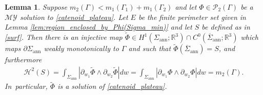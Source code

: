 \documentclass[JEP,XML,SOM,Unicode, NoFloatCountersInSection,published]{cedram}
\newcommand{\R}{\mathbb{R}}
\newcommand{\openannulus}{\Sigma_\mathrm{ann}}
\newtheorem{lemma}[theorem]{Lemma}
\theoremstyle{definition}
\begin{document}
\begin{lemma}\label{lem:construction-of-parametrization}
Suppose $m_2(\Gamma)<m_1(\Gamma_1)+m_1(\Gamma_2)$ and let $\Phi\in\mathcal{P}_2(\Gamma)$ be a $\mathcal{MY}$ solution to \eqref{catenoid_plateau}. Let $E$ be the finite perimeter set given in Lemma \ref{lem:region_enclosed_by_Phi(Sigma_min)} and let
$S$ be defined as in \eqref{surf}.
Then there is an injective map $\widetilde\Phi\in H^1
(\openannulus;\R^3)\cap C^0(\overline \Sigma_\mathrm{ann};\R^3)$
which maps $\partial \openannulus$
weakly monotonically to $\Gamma$ and such that $\widetilde\Phi (\overline \Sigma_\mathrm{ann}) =S$, and
furthermore
\begin{align}\label{eq:area-symmetrization}
\mathcal H^2(S)= \int_{\Sigma_{\mathrm{ann}}}|\partial_{w_1}\widetilde \Phi\wedge \partial_{w_2}\widetilde \Phi |dw=
\int_{\Sigma_{\mathrm{ann}}}|\partial_{w_1}\Phi\wedge\partial_{w_2}\Phi|dw=m_2(\Gamma).
\end{align}
In~particular, $\widetilde \Phi$ is a solution of \eqref{catenoid_plateau}.
\end{lemma}
\end{document}

